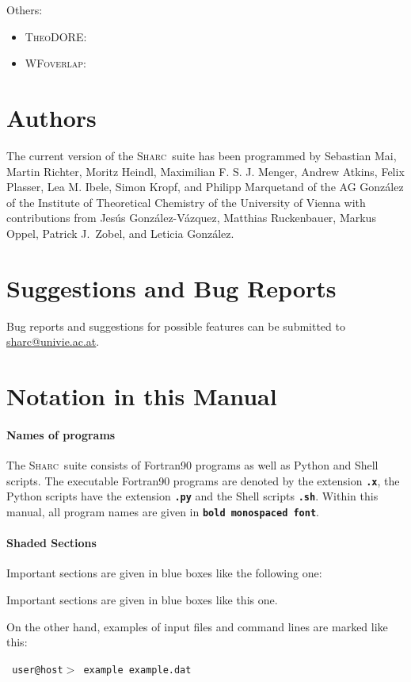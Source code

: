 \documentclass[a4paper,10pt,DIV=15,openany]{scrbook}
\newcommand{\tthdump}[1]{#1}
\newcommand{\link}[2]{\href{#1}{#2}}
\newcommand{\sharc}{\textsc{Sharc}}
\newcommand{\ttt}[1]{\textbf{\texttt{#1}}}
\newenvironment{example}{
  \setlength{\OuterFrameSep}{3pt}
  \vspace{0mm}
  \definecolor{shadecolor}{HTML}{E4F4FF}
  \begin{shaded}
}{
  \end{shaded}
}
\begin{document}
Others:
\begin{itemize}
  \item \textsc{TheoDORE}: \cite{Plasser2014JCP1, Plasser2014JCP2, Plasser2017TheoDORE}
  \item \textsc{WFoverlap}: \cite{Plasser2016JCTC, Plasser2016JCP}
\end{itemize}


\section{Authors}

The current version of the \sharc\ suite has been programmed by Sebastian Mai, Martin Richter, Moritz Heindl, Maximilian F. S. J. Menger, Andrew Atkins, Felix Plasser, Lea M. Ibele, Simon Kropf, and Philipp Marquetand of the AG Gonz\'alez of the Institute of Theoretical Chemistry of the University of Vienna with contributions from Jes\'us Gonz\'alez-V\'azquez, Matthias Ruckenbauer, Markus Oppel, Patrick J.\ Zobel, and Leticia Gonz\'alez.

\section{Suggestions and Bug Reports}

\begin{shaded}
Bug reports and suggestions for possible features can be submitted to \link{mailto:sharc@univie.ac.at}{sharc@univie.ac.at}.
\end{shaded}

\section{Notation in this Manual}

\paragraph{Names of programs}

The \sharc\ suite consists of Fortran90 programs as well as Python and Shell scripts. The executable Fortran90 programs are denoted by the extension \ttt{.x}, the Python scripts have the extension \ttt{.py} and the Shell scripts \ttt{.sh}. Within this manual, all program names are given in \ttt{bold monospaced font}.

\tthdump{
\paragraph{Shaded Sections}

Important sections are given in blue boxes like the following one:
\begin{shaded}
Important sections are given in blue boxes like this one.
\end{shaded}

On the other hand, examples of input files and command lines are marked like this:
\begin{example}
  \texttt{ user@host$>$ example example.dat}
\end{example}
}
\end{document}
